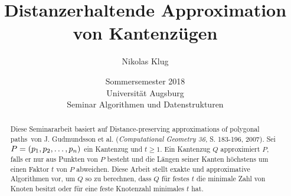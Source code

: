 \documentclass[11pt]{article}
\title{Distanzerhaltende Approximation von Kantenzügen}
\author{Nikolas Klug}
\date{Sommersemester 2018
	\\ Universität Augsburg
	\\ Seminar Algorithmen und Datenstrukturen
}
\begin{document}
    \maketitle

    \begin{abstract}
        Diese Seminararbeit basiert auf \glqq Distance-preserving approximations of polygonal paths\grqq\ von J. Gudmundsson et al. (\textit{Computational Geometry 36}, S. 183-196, 2007). 
        Sei $P = (p_1, p_2, \mathellipsis, p_n)$ ein Kantenzug und $t \geq 1$. Ein Kantenzug $Q$ approximiert $P$, falls er nur aus Punkten von $P$ besteht und die Längen seiner Kanten höchstens um einen Faktor $t$ von $P$ abweichen. 
        Diese Arbeit stellt exakte und approximative Algorithmen vor, um $Q$ so zu berechnen, dass $Q$ für festes $t$ die minimale Zahl von Knoten besitzt oder für eine feste Knotenzahl minimales $t$ hat.
    \end{abstract}
\end{document}
